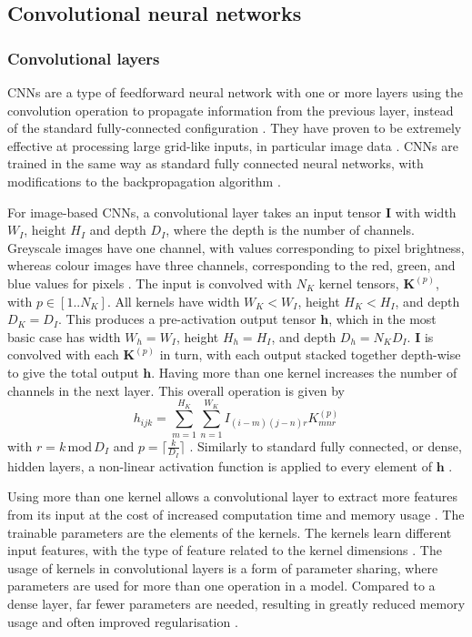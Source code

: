 \documentclass[12pt]{article}
\begin{document}
\subsection{Convolutional neural networks}
\subsubsection{Convolutional layers}
CNNs are a type of feedforward neural network with one or more layers using the convolution operation to propagate information from the previous layer, instead of the standard fully-connected configuration \cite{Goodfellow16}. They have proven to be extremely effective at processing large grid-like inputs, in particular image data \cite{Shrestha19}. CNNs are trained in the same way as standard fully connected neural networks, with modifications to the backpropagation algorithm \cite{Bengio93}.

For image-based CNNs, a convolutional layer takes an input tensor $\bm{I}$ with width $W_I$, height $H_I$ and depth $D_I$, where the depth is the number of channels. Greyscale images have one channel, with values corresponding to pixel brightness, whereas colour images have three channels, corresponding to the red, green, and blue values for pixels \cite{Aghdam17, Goodfellow16}. The input is convolved with $N_K$ kernel tensors, $\bm{K}^{(p)}$, with $p\in[1..N_K]$. All kernels have width $W_K<W_I$, height $H_K<H_I$, and depth $D_K=D_I$. This produces a pre-activation output tensor $\bm{\bm{h}}$, which in the most basic case has width $W_h=W_I$, height $H_h=H_I$, and depth $D_h=N_KD_I$. $\bm{I}$ is convolved with each $\bm{K}^{(p)}$ in turn, with each output stacked together depth-wise to give the total output $\bm{h}$. Having more than one kernel increases the number of channels in the next layer. This overall operation is given by
\begin{equation}
\label{ConvLayer}
h_{ijk}=\sum_{m=1}^{H_K}\sum_{n=1}^{W_K}I_{(i-m)(j-n)r}K_{mnr}^{(p)}
\end{equation}
with $r=k\,\mathrm{mod}\,D_I$ and $p=\lceil\frac{k}{D_I}\rceil$ \cite{Aghdam17, Goodfellow16}. Similarly to standard fully connected, or dense, hidden layers, a non-linear activation function is applied to every element of $\bm{h}$ \cite{Aghdam17, Goodfellow16}. 

Using more than one kernel allows a convolutional layer to extract more features from its input at the cost of increased computation time and memory usage \cite{Goodfellow16}. The trainable parameters are the elements of the kernels. The kernels learn different input features, with the type of feature related to the kernel dimensions \cite{Aghdam17, Goodfellow16}. The usage of kernels in convolutional layers is a form of parameter sharing, where parameters are used for more than one operation in a model. Compared to a dense layer, far fewer parameters are needed, resulting in greatly reduced memory usage and often improved regularisation \cite{Aghdam17, Goodfellow16}. 
\end{document}
